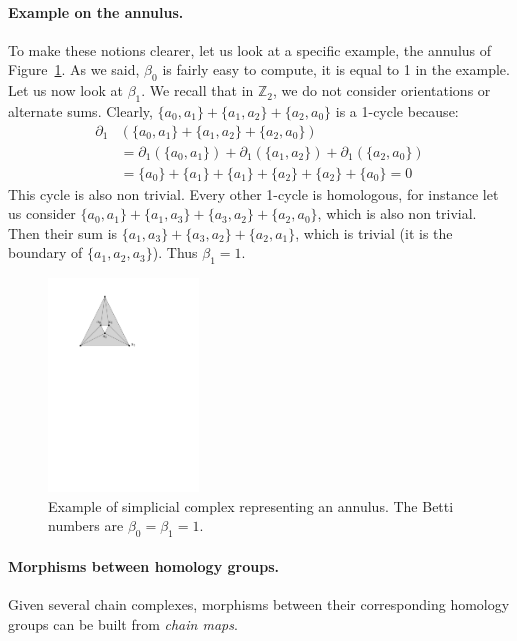 \paragraph*{Example on the annulus.} 
To make these notions clearer, let us look at a specific example, the annulus of Figure~\ref{fig:annu}. 
As we said, $\beta_{0}$ is fairly easy to compute, it is equal to 1 in the example. Let us 
now look at $\beta_{1}$. We recall that in $\mathbb{Z}_{2}$, we do not consider orientations or 
alternate sums. Clearly, $\{a_{0},a_{1}\}+\{a_{1},a_{2}\}+\{a_{2},a_{0}\}$ is a 1-cycle because: 
\begin{align*}
\partial_{1} &(\{a_{0},a_{1}\}+\{a_{1},a_{2}\}+\{a_{2},a_{0}\})\nonumber\\
&=\partial_{1}(\{a_{0},a_{1}\})+\partial_{1}(\{a_{1},a_{2}\})+\partial_{1}(\{a_{2},a_{0}\})\nonumber\\
&=\{a_{0}\}+\{a_{1}\}+\{a_{1}\}+\{a_{2}\}+\{a_{2}\}+\{a_{0}\}=0\nonumber 
\end{align*} 
This cycle is also non trivial. Every other 1-cycle is homologous, for instance let us 
consider $\{a_{0},a_{1}\}+\{a_{1},a_{3}\}+\{a_{3},a_{2}\}+\{a_{2},a_{0}\}$, which is also non trivial. 
Then their sum is $\{a_{1},a_{3}\}+\{a_{3},a_{2}\}+\{a_{2},a_{1}\}$, which is trivial 
(it is the boundary of $\{a_{1},a_{2},a_{3}\}$). Thus $\beta_{1}=1$. 

\begin{figure}[h] \centering 
\includegraphics[width = 4cm]{figures/Annulus} 
\caption[Homology of annulus]{\label{fig:annu}
Example of simplicial complex representing an annulus. 
The Betti numbers are $\beta_{0}=\beta_{1}=1$.}
\end{figure}

\paragraph*{Morphisms between homology groups.}
Given several chain complexes, morphisms between their corresponding
homology groups can be built from {\em chain maps}.

